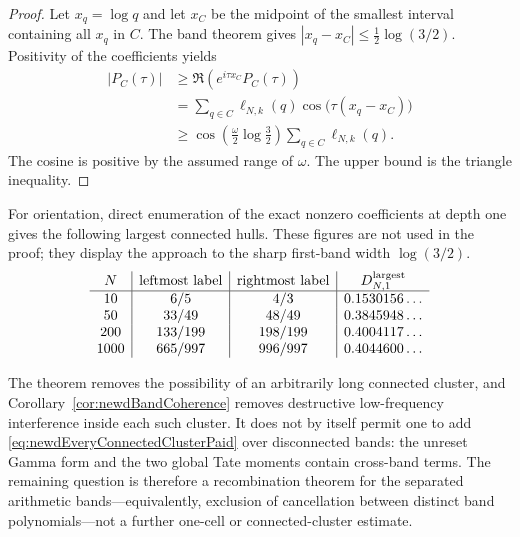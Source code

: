 \documentclass[11pt]{amsart}
\theoremstyle{definition}
\theoremstyle{remark}
\begin{document}
\begin{proof}
Let $x_q=\log q$ and let $x_C$ be the midpoint of the smallest interval
containing all $x_q$ in $C$.  The band theorem gives
$|x_q-x_C|\leq\tfrac12\log(3/2)$.  Positivity of the coefficients yields
\begin{align*}
 |P_C(\tau)|
 &\geq \Re\!\left(e^{i\tau x_C}P_C(\tau)\right)\\
 &=\sum_{q\in C}\ell_{N,k}(q)
       \cos\bigl(\tau(x_q-x_C)\bigr)\\
 &\geq
 \cos\!\left(\frac{\omega}{2}\log\frac32\right)
 \sum_{q\in C}\ell_{N,k}(q).
\end{align*}
The cosine is positive by the assumed range of $\omega$.  The upper bound
is the triangle inequality.
\end{proof}

For orientation, direct enumeration of the exact nonzero coefficients at
depth one gives the following largest connected hulls.  These figures are
not used in the proof; they display the approach to the sharp first-band
width $\log(3/2)$.
\[
\begin{array}{c|c|c|c}
N&\text{leftmost label}&\text{rightmost label}&
 D_{N,1}^{\rm largest}\\ \hline
10&6/5&4/3&0.1530156\ldots\\
50&33/49&48/49&0.3845948\ldots\\
200&133/199&198/199&0.4004117\ldots\\
1000&665/997&996/997&0.4044600\ldots
\end{array}
\]

The theorem removes the possibility of an arbitrarily long connected
cluster, and Corollary~\ref{cor:newdBandCoherence} removes destructive
low-frequency interference inside each such cluster.  It does not by
itself permit one to add
\eqref{eq:newdEveryConnectedClusterPaid} over disconnected bands: the
unreset Gamma form and the two global Tate moments contain cross-band
terms.  The remaining question is therefore a recombination theorem for
the separated arithmetic bands---equivalently, exclusion of cancellation
between distinct band polynomials---not a further one-cell or
connected-cluster estimate.
\end{document}
